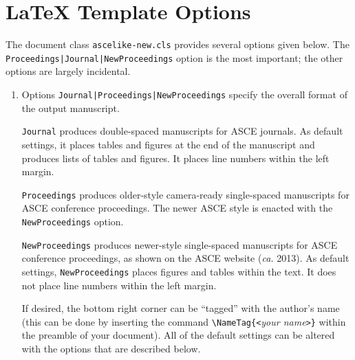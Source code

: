 \documentclass[Journal,letterpaper,NoLineNumbers]{ascelike-new}
\begin{document}
\section{LaTeX Template Options}
\label{app:options}

The document class \texttt{ascelike-new.cls} provides several options given below.
The \verb+Proceedings|+\-\verb+Journal|+\-\verb+NewProceedings+ option is the most important; the other options are largely incidental.

\begin{enumerate}
\item
Options
\verb+Journal|+\verb+Proceedings|+\verb+NewProceedings+ specify the overall format of the output man\-u\-script.  

\texttt{Journal} produces double-spaced manuscripts for ASCE journals.
As default settings, it places tables and figures at the end of the manuscript and produces lists of tables and figures.  
It places line numbers within the left margin.

\texttt{Proceedings} produces older-style camera-ready single-spaced 
manu\-scripts for ASCE conference proceedings.  
The newer ASCE style is enacted with the \verb+NewProceedings+ option.

\texttt{NewProceedings} produces newer-style single-spaced 
manu\-scripts for ASCE conference proceedings, as shown on the 
ASCE website (\emph{ca.} 2013).  
As default settings, \verb+NewProceedings+ places figures and tables within the text. It does not place line numbers within the left margin.

If desired, the bottom right corner can be ``tagged'' with
the author's name (this can be done by inserting the command
\verb+\NameTag{<+\emph{your name}\verb+>}+ within the preamble of your
document).
All of the default settings can be altered with the options that are
described below.


\end{enumerate}
\end{document}
